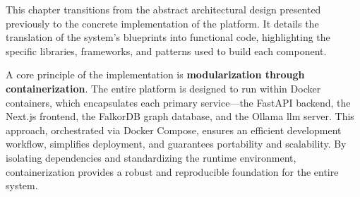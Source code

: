 This chapter transitions from the abstract architectural design presented previously to the concrete implementation of the platform. It details the translation of the system's blueprints into functional code, highlighting the specific libraries, frameworks, and patterns used to build each component.

A core principle of the implementation is \textbf{modularization through containerization}. The entire platform is designed to run within Docker containers, which encapsulates each primary service—the FastAPI backend, the Next.js frontend, the FalkorDB graph database, and the Ollama \ac{llm} server. This approach, orchestrated via Docker Compose, ensures an efficient development workflow, simplifies deployment, and guarantees portability and scalability. By isolating dependencies and standardizing the runtime environment, containerization provides a robust and reproducible foundation for the entire system.